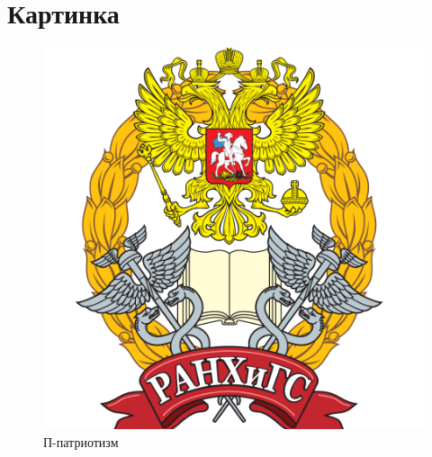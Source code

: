 \documentclass[12pt,a4paper, oneside]{extreport}
\begin{document}
\chapter[Картинка]{Картинка}

\begin{figure}[H]
	\includegraphics[width=1\linewidth]{ranepa}
	\caption{П-патриотизм}
\end{figure}
\end{document}
